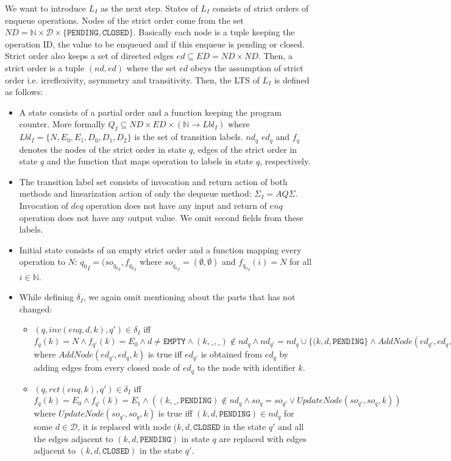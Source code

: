 We want to introduce $L_I$ as the next step. States of $L_I$ consists of strict orders of enqueue operations. Nodes of the strict order come from the set $ND = \mathbb{N} \times \mathcal{D} \times \{ \texttt{PENDING}, \texttt{CLOSED}\}$. Basically each node is a tuple keeping the operation ID, the value to be enqueued and if this enqueue is pending or closed. Strict order also keeps a set of directed edges $ ed \subseteq ED = ND \times ND$. Then, a strict order is a tuple $(nd, ed)$ where the set $ed$ obeys the assumption of strict order i.e. irreflexivity, asymmetry and transitivity. Then, the LTS of $L_I$ is defined as follows:
\begin{itemize}
\item A state consists of a partial order and a function keeping the program counter. More formally $Q_I \subseteq ND \times ED \times (\mathbb{N} \rightarrow Lbl_I)$ where $Lbl_I = \{N, E_0, E_1, D_0, D_1, D_2\} $ is the set of transition labels. $nd_q$ $ed_q$ and $f_q$ denotes the nodes of the strict order in state $q$, edges of the strict order in state $q$ and the function that maps operation to labels in state $q$, respectively. 
\item The transition label set consists of invocation and return action of both methods and linearization action of only the dequeue method: $\Sigma_I = AQ\Sigma$. Invocation of $deq$ operation does not have any input and return of $enq$ operation does not have any output value. We omit second fields from these labels.
\item Initial state consists of an empty strict order and a function mapping every operation to $N$: ${q_0}_{I} = (so_{{q_0}_I}, f_{{q_0}_I}$ where $so_{{q_0}_I} =(\emptyset, \emptyset)$ and $f_{{q_0}_I}(i) = N$ for all $i \in \mathbb{N}$.
\item While defining $\delta_I$, we again omit mentioning about the parts that has not changed:
\begin{itemize}
\item $(q, inv(enq,d,k), q') \in \delta_I$ iff $f_q(k) = N \wedge f_{q'}(k) = E_0 \wedge d \neq \texttt{EMPTY} \wedge (k,\_,\_) \notin nd_q \wedge nd_{q'} = nd_q \cup \{ (k,d,\texttt{PENDING}\} \wedge AddNode(ed_{q'}, ed_q,k)$ where $AddNode(ed_{q'}, ed_q,k)$ is true iff $ed_{q'}$ is obtained from $ed_q$ by adding edges from every closed node of $ed_q$ to the node with identifier $k$.
\item $(q, ret(enq,k), q') \in \delta_I$ iff $f_q(k) =E_0 \wedge f_{q'}(k) = E_1 \wedge ( (k,\_,\texttt{PENDING}) \notin nd_q \wedge so_q = so_{q'} \vee UpdateNode(so_{q'}, so_q, k) )$ where $UpdateNode(so_{q'}, so_q, k)$ is true iff $(k,d,\texttt{PENDING}) \in nd_q$ for some $d \in \mathcal{D}$, it is replaced with node $(k,d,\texttt{CLOSED}$ in the state $q'$ and all the edges adjacent to $(k,d,\texttt{PENDING})$ in state $q$ are replaced with edges adjacent to $(k,d,\texttt{CLOSED})$ in the state $q'$.

\end{itemize}
\end{itemize}
